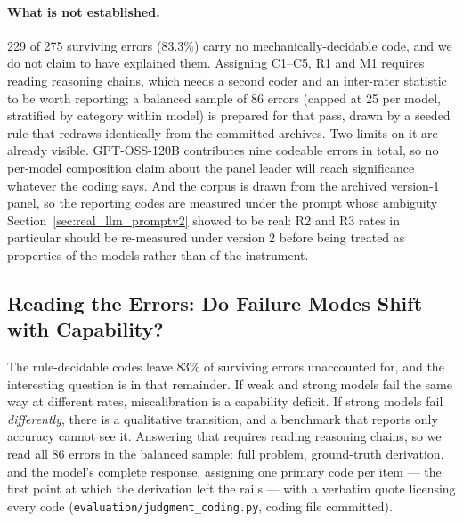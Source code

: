 \documentclass{article}
\begin{document}
\paragraph{What is not established.} 229 of 275 surviving errors (83.3\%) carry no mechanically-decidable code, and we do not claim to have explained them. Assigning C1--C5, R1 and M1 requires reading reasoning chains, which needs a second coder and an inter-rater statistic to be worth reporting; a balanced sample of 86 errors (capped at 25 per model, stratified by category within model) is prepared for that pass, drawn by a seeded rule that redraws identically from the committed archives. Two limits on it are already visible. GPT-OSS-120B contributes nine codeable errors in total, so no per-model composition claim about the panel leader will reach significance whatever the coding says. And the corpus is drawn from the archived version-1 panel, so the reporting codes are measured under the prompt whose ambiguity Section~\ref{sec:real_llm_promptv2} showed to be real: R2 and R3 rates in particular should be re-measured under version 2 before being treated as properties of the models rather than of the instrument.

\subsection{Reading the Errors: Do Failure Modes Shift with Capability?}
\label{sec:judgment}

The rule-decidable codes leave 83\% of surviving errors unaccounted for, and the interesting question is in that remainder. If weak and strong models fail the same way at different rates, miscalibration is a capability deficit. If strong models fail \emph{differently}, there is a qualitative transition, and a benchmark that reports only accuracy cannot see it. Answering that requires reading reasoning chains, so we read all 86 errors in the balanced sample: full problem, ground-truth derivation, and the model's complete response, assigning one primary code per item --- the first point at which the derivation left the rails --- with a verbatim quote licensing every code (\texttt{evaluation/judgment\_coding.py}, coding file committed).
\end{document}
